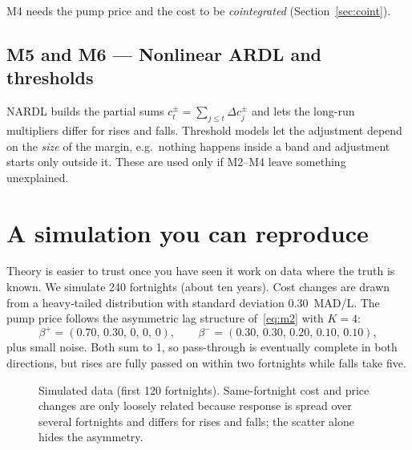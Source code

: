 \documentclass[11pt,a4paper]{article}
\theoremstyle{definition}
\begin{document}
\begin{table}[h]
\centering

\caption{Half-life of a margin deviation for different adjustment speeds $\gamma$.}
\end{table}

M4 needs the pump price and the cost to be \emph{cointegrated} (Section~\ref{sec:coint}).

\subsection*{M5 and M6 --- Nonlinear ARDL and thresholds}
NARDL builds the partial sums $c^{\pm}_t=\sum_{j\le t}\Delta c^{\pm}_j$ and lets the long-run multipliers differ for rises and falls\cite{syg14}. Threshold models let the adjustment depend on the \emph{size}
of the margin, e.g.\ nothing happens inside a band and adjustment starts only outside it\cite{qz}. These are used only if M2--M4 leave something unexplained.

\section{A simulation you can reproduce}\label{sec:sim}

Theory is easier to trust once you have seen it work on data where the truth is known. We simulate 240 fortnights (about ten years). Cost changes are drawn from a
heavy-tailed distribution with standard deviation 0.30~MAD/L. The pump price follows the asymmetric lag structure of~\eqref{eq:m2} with $K=4$:
\[
\beta^{+}=(0.70,\,0.30,\,0,\,0,\,0),\qquad \beta^{-}=(0.30,\,0.30,\,0.20,\,0.10,\,0.10),
\]
plus small noise. Both sum to 1, so pass-through is eventually complete in both directions, but rises are fully passed on within two fortnights while falls take five.

\begin{figure}[h]
\centering
{}
\caption{Simulated data (first 120 fortnights). Same-fortnight cost and price changes are only loosely related because response is spread over several fortnights and differs for rises and falls; the scatter alone hides the asymmetry.}
\end{figure}
\end{document}
